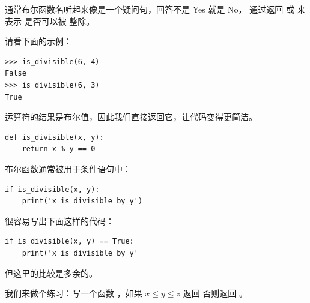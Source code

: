 
通常布尔函数名听起来像是一个疑问句，回答不是 Yes 就是 No，  通过返回  或  来表示  是否可以被  整除。


请看下面的示例：

\begin{lstlisting}
>>> is_divisible(6, 4)
False
>>> is_divisible(6, 3)
True
\end{lstlisting}


\li{==} 运算符的结果是布尔值，因此我们直接返回它，让代码变得更简洁。

\begin{lstlisting}
def is_divisible(x, y):
    return x % y == 0
\end{lstlisting}

%

布尔函数通常被用于条件语句中：
  

\begin{lstlisting}
if is_divisible(x, y):
    print('x is divisible by y')
\end{lstlisting}

%

很容易写出下面这样的代码：

\begin{lstlisting}
if is_divisible(x, y) == True:
    print('x is divisible by y'
\end{lstlisting}

%

但这里的比较是多余的。


我们来做个练习：写一个函数   ，如果 $x \le y \le z$ 返回  否则返回 。

